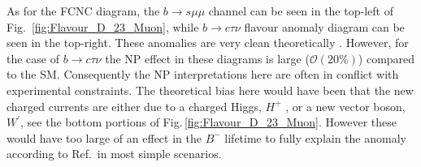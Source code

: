 \documentclass[10pt]{report}
\begin{document}
As for the FCNC diagram, the $b \rightarrow s \mu \mu$ channel can be seen in the top-left of Fig.~\ref{fig:Flavour_D_23_Muon}, while $b \rightarrow c \tau \nu$ flavour anomaly diagram can be seen in the top-right. These anomalies are very clean theoretically \cite{Fajfer_2012}. However, for the case of  $b \rightarrow c \tau \nu$ the NP effect in these diagrams is large ($\mathcal{O}(20\%)$) compared to the SM.
%
Consequently the NP interpretations here are often in conflict with experimental constraints. 
%
The theoretical bias here would have been that the new charged currents are either due to a charged Higgs, $H^+$ , or a new vector boson, $W^\prime$, see the bottom portions of Fig.\,\ref{fig:Flavour_D_23_Muon}. However these would have too large of an effect in the $B^-$ lifetime to fully explain the anomaly according to Ref.\,\cite{Alonso_2017} in most simple scenarios.
%
\end{document}
